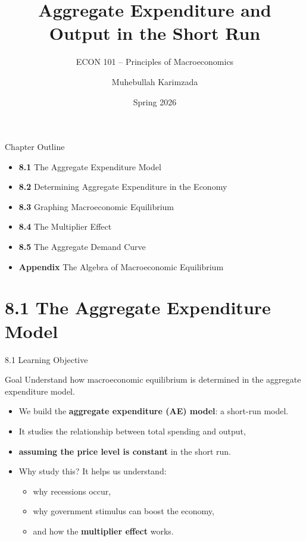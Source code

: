 \documentclass[aspectratio=169]{beamer}
\title{\textbf{Aggregate Expenditure and Output in the Short Run}}
\subtitle{{\large ECON 101 -- Principles of Macroeconomics}}
\author{Muhebullah Karimzada}
\date{Spring 2026}
\begin{document}

\begin{frame}[plain]
  \titlepage
\end{frame}

\begin{frame}{Chapter Outline}
\transfade
\begin{itemize}
  \item \textbf{8.1} The Aggregate Expenditure Model
  \item \textbf{8.2} Determining Aggregate Expenditure in the Economy
  \item \textbf{8.3} Graphing Macroeconomic Equilibrium
  \item \textbf{8.4} The Multiplier Effect
  \item \textbf{8.5} The Aggregate Demand Curve
  \item \textbf{Appendix} The Algebra of Macroeconomic Equilibrium
\end{itemize}
\end{frame}

\section{8.1 The Aggregate Expenditure Model}

\begin{frame}{8.1 Learning Objective}
\transfade
\begin{block}{Goal}
Understand how macroeconomic equilibrium is determined in the aggregate expenditure model.
\end{block}
\begin{itemize}
  \item We build the \textbf{aggregate expenditure (AE) model}: a short-run model.
  \item It studies the relationship between total spending and output,
  \item \textbf{assuming the price level is constant} in the short run.
  \item Why study this? It helps us understand:
  \begin{itemize}
    \item why recessions occur,
    \item why government stimulus can boost the economy,
    \item and how the \textbf{multiplier effect} works.
  \end{itemize}
\end{itemize}
\end{frame}
\end{document}
